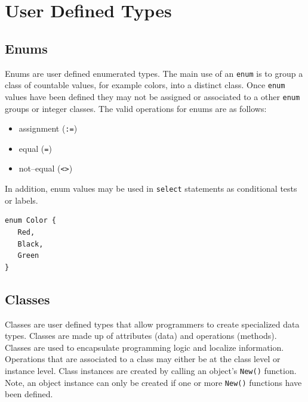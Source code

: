 \documentclass[12pt]{article}
\begin{document}
\section{User Defined Types}

\subsection{Enums}
Enums are user defined enumerated types.  The main use of an  \texttt{enum}  is to group a class of countable values, for example colors, into a distinct class.  Once \texttt{enum}  values have been defined they may not be assigned or associated to a other \texttt{enum}  groups or integer classes.  The valid operations for enums are as follows:

\begin{itemize}
    \item assignment (\texttt{:=})
    \item equal (\texttt{=})
    \item not--equal (\texttt{<>})
\end{itemize}

In addition, enum values may be used in \texttt{select} statements as conditional tests or labels.

\begin{verbatim}
enum Color {
   Red,
   Black,
   Green
}
\end{verbatim}

\subsection{Classes}
Classes are user defined types that allow programmers to create specialized data types.  Classes are made up of attributes (data) and operations (methods).  Classes are used to encapsulate programming logic and localize information.  Operations that are associated to a class may either be at the class level or instance level.  Class instances are created by calling an object's \texttt{New()} function.  Note, an object instance can only be created if one or more \texttt{New()} functions have been defined.
\end{document}
